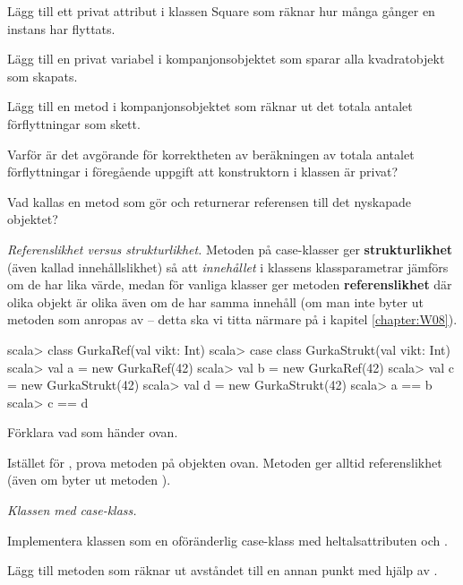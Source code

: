 \Subtask Lägg till ett privat attribut  i klassen Square som räknar hur många gånger en instans har flyttats. 

\Subtask Lägg till en privat variabel  i kompanjonsobjektet som sparar alla kvadratobjekt som skapats.

\Subtask Lägg till en metod  i kompanjonsobjektet som räknar ut det totala antalet förflyttningar som skett.

\Subtask\Pen Varför är det avgörande för korrektheten av beräkningen av totala antalet förflyttningar i föregående uppgift att konstruktorn i klassen  är privat? 

\Subtask\Pen Vad kallas en metod som gör  och returnerar referensen till det nyskapade objektet?


\Task \emph{Referenslikhet versus strukturlikhet.} Metoden \code{==} på case-klasser ger \textbf{strukturlikhet} (även kallad innehållslikhet) så att \emph{innehållet} i klassens klassparametrar jämförs om de har lika värde, medan för vanliga klasser ger metoden \code{==} \textbf{referenslikhet} där olika objekt är olika även om de har samma innehåll (om man inte byter ut metoden  som anropas av \code{==} -- detta ska vi titta närmare på i kapitel \ref{chapter:W08}).

\begin{REPL}
scala> class GurkaRef(val vikt: Int)
scala> case class GurkaStrukt(val vikt: Int)
scala> val a = new GurkaRef(42)
scala> val b = new GurkaRef(42)
scala> val c = new GurkaStrukt(42)
scala> val d = new GurkaStrukt(42)
scala> a == b
scala> c == d 
\end{REPL}

\Subtask Förklara vad som händer ovan.

\Subtask Istället för \code{==}, prova metoden  på objekten ovan. Metoden  ger alltid referenslikhet (även om byter ut metoden ).



\Task \label{task:Point} \emph{Klassen  med case-klass.} 

\Subtask Implementera klassen  som en oföränderlig case-klass med heltalsattributen  och . 

\Subtask Lägg till metoden  som räknar ut avståndet till en annan punkt med hjälp av .

